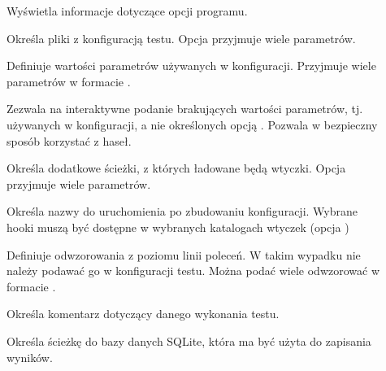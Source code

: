 \documentclass[00-praca-magisterska.tex]{subfiles}
\begin{document}
\begin{description}
\item[]

Wyświetla informacje dotyczące opcji programu.

\item[]

Określa pliki z konfiguracją testu. Opcja przyjmuje wiele parametrów.

\item[]

Definiuje wartości parametrów używanych w konfiguracji. Przyjmuje wiele
parametrów w formacie .

\item[]

Zezwala na interaktywne podanie brakujących wartości parametrów, tj. używanych w
konfiguracji, a nie określonych opcją . Pozwala w bezpieczny sposób
korzystać z haseł.

\item[]

Określa dodatkowe ścieżki, z których ładowane będą wtyczki. Opcja przyjmuje
wiele parametrów.

\item[]

Określa nazwy  do uruchomienia po zbudowaniu konfiguracji.
Wybrane hooki muszą być dostępne w wybranych katalogach wtyczek (opcja
)

\item[]

Definiuje odwzorowania z poziomu linii poleceń. W takim wypadku nie należy
podawać go w konfiguracji testu. Można podać wiele odwzorować w formacie
.

\item[]

Określa komentarz dotyczący danego wykonania testu.

\item[]

Określa ścieżkę do bazy danych SQLite, która ma być użyta do zapisania wyników.

\end{description}
\end{document}
